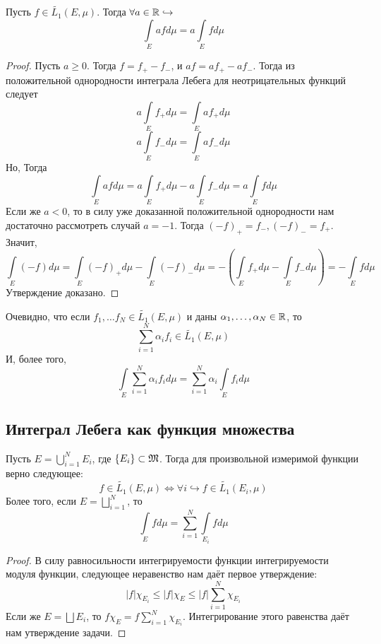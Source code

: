 \begin{proposition}
    Пусть $f \in \widetilde{L_1}(E, \mu)$. Тогда $\forall a \in \mathbb{R} \hookrightarrow$ \[\int\limits_E afd\mu = a\int\limits_E fd\mu\]
\end{proposition}
\begin{proof}
    Пусть $a \geq 0$. Тогда $f = f_+ - f_-$, и $af = af_+ - af_-$. Тогда из положительной однородности интеграла Лебега для неотрицательных функций следует \[a\int\limits_E f_+d\mu = \int\limits_E af_+d\mu\]
    \[a\int\limits_E f_-d\mu = \int\limits_E af_-d\mu\]
    Но, Тогда \[\int\limits_E afd\mu = a\int\limits_E f_+d\mu - a\int\limits_E f_-d\mu = a\int\limits_E fd\mu\]
    Если же $a < 0$, то в силу уже доказанной положительной однородности нам достаточно рассмотреть случай $a = -1$. Тогда $(-f)_+ = f_-, (-f)_- = f_+$. Значит, \[\int\limits_E (-f)d\mu = \int\limits_E (-f)_+d\mu - \int\limits_E (-f)_-d\mu = -(\int\limits_E f_+d\mu - \int\limits_E f_-d\mu) = -\int\limits_E fd\mu\]
    Утверждение доказано.
\end{proof}
\begin{corollary}
    Очевидно, что если $f_1, \ldots f_N \in \widetilde{L_1}(E, \mu)$ и даны $\alpha_1, \ldots, \alpha_N \in \mathbb{R}$, то \[\sum\limits_{i = 1}^N \alpha_if_i \in \widetilde{L_1}(E, \mu)\]
    И, более того, \[\int\limits_E \sum\limits_{i = 1}^N \alpha_if_i d\mu = \sum\limits_{i = 1}^N \alpha_i \int\limits_E f_i d\mu\]
\end{corollary}

\subsection{Интеграл Лебега как функция множества}
\begin{proposition}
    Пусть $E = \bigcup\limits_{i = 1}^N E_i$, где $\{E_i\} \subset \mathfrak{M}$. Тогда для произвольной измеримой функции верно следующее: \[f \in \widetilde{L_1}(E, \mu) \Longleftrightarrow \forall i \hookrightarrow f \in \widetilde{L_1}(E_i, \mu)\]
    Более того, если $E = \bigsqcup\limits_{i = 1}^N$, то \[\int\limits_{E} fd\mu = \sum\limits_{i = 1}^N \int\limits_{E_i} fd\mu\]
\end{proposition}
\begin{proof}
    В силу равносильности интегрируемости функции интегрируемости модуля функции, следующее неравенство нам даёт первое утверждение: \[|f|\chi_{E_i} \leq |f|\chi_E \leq |f|\sum\limits_{i = 1}^N \chi_{E_i}\]
    Если же $E = \bigsqcup E_i$, то $f \chi_E = f \sum\limits_{i = 1}^N \chi_{E_i}$. Интегрирование этого равенства даёт нам утверждение задачи.
\end{proof}


